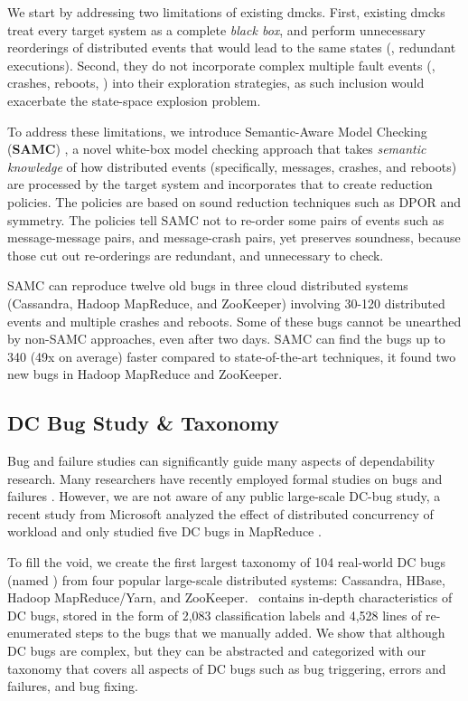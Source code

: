 We start by addressing two limitations of existing dmcks. First, existing dmcks
treat every target system as a complete \textit{black box}, and perform
unnecessary reorderings of distributed events that would lead to the same states
(\ie, redundant executions). Second, they do not incorporate complex multiple
fault events (\eg, crashes, reboots, \etc) into their exploration strategies, as
such inclusion would exacerbate the state-space explosion problem.

To address these limitations, we introduce Semantic-Aware Model Checking
(\textbf{SAMC}) \cite{Leesatapornwongsa+15-SamcIssta,Leesatapornwongsa+14-Samc},
a novel white-box model checking approach that takes \textit{semantic knowledge}
of how distributed events (specifically, messages, crashes, and reboots) are
processed by the target system and incorporates that to create reduction
policies. The policies are based on sound reduction techniques such as DPOR and
symmetry. The policies tell SAMC not to re-order some pairs of events such as
message-message pairs, and message-crash pairs, yet preserves soundness, because
those cut out re-orderings are redundant, and unnecessary to check.

SAMC can reproduce twelve old bugs in three cloud distributed systems
(Cassandra, Hadoop MapReduce, and ZooKeeper) involving 30-120 distributed events
and multiple crashes and reboots. Some of these bugs cannot be unearthed by
non-SAMC approaches, even after two days. SAMC can find the bugs up to 340 (49x
on average) faster compared to state-of-the-art techniques, it found two new
bugs in Hadoop MapReduce and ZooKeeper.

\subsection{DC Bug Study \& Taxonomy}

Bug and failure studies can significantly guide many aspects of dependability
research. Many researchers have recently employed formal studies on bugs and
failures .
%
However, we are not aware of any public large-scale DC-bug study, a recent study
from Microsoft analyzed the effect of distributed concurrency of workload and
only studied five DC bugs in MapReduce .

To fill the void, we create the first largest taxonomy of 104 real-world DC bugs
(named \taxdc) \cite{Leesatapornwongsa+16-TaxDC} from four popular large-scale
distributed systems: Cassandra, HBase, Hadoop MapReduce/Yarn, and ZooKeeper.
\taxdc\ contains in-depth characteristics of DC bugs, stored in the form of
2,083 classification labels and 4,528 lines of re-enumerated steps to the bugs
that we manually added. We show that although DC bugs are complex, but they can
be abstracted and categorized with our taxonomy that covers all aspects of DC
bugs such as bug triggering, errors and failures, and bug fixing.


